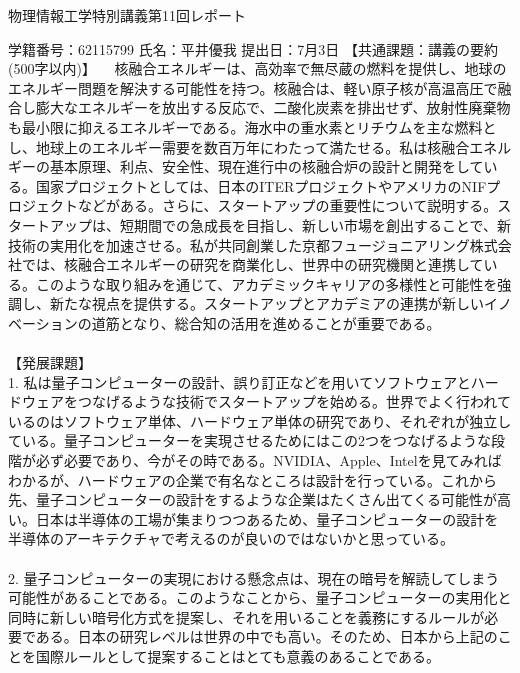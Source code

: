 \documentclass[a4paper,10.5pt]{ltjsarticle}
\begin{document}
\centerline
{\huge 物理情報工学特別講義第11回レポート}
\rightline
{学籍番号：62115799}
\rightline
{氏名：平井優我}
\rightline
{提出日：7月3日}
\rightline
{}
\leftline
{\large 【共通課題：講義の要約(500字以内)】}
　核融合エネルギーは、高効率で無尽蔵の燃料を提供し、地球のエネルギー問題を解決する可能性を持つ。核融合は、軽い原子核が高温高圧で融合し膨大なエネルギーを放出する反応で、二酸化炭素を排出せず、放射性廃棄物も最小限に抑えるエネルギーである。海水中の重水素とリチウムを主な燃料とし、地球上のエネルギー需要を数百万年にわたって満たせる。私は核融合エネルギーの基本原理、利点、安全性、現在進行中の核融合炉の設計と開発をしている。国家プロジェクトとしては、日本のITERプロジェクトやアメリカのNIFプロジェクトなどがある。さらに、スタートアップの重要性について説明する。スタートアップは、短期間での急成長を目指し、新しい市場を創出することで、新技術の実用化を加速させる。私が共同創業した京都フュージョニアリング株式会社では、核融合エネルギーの研究を商業化し、世界中の研究機関と連携している。このような取り組みを通じて、アカデミックキャリアの多様性と可能性を強調し、新たな視点を提供する。スタートアップとアカデミアの連携が新しいイノベーションの道筋となり、総合知の活用を進めることが重要である。\\
\\
\leftline
{\large 【発展課題】}\\
1. 私は量子コンピューターの設計、誤り訂正などを用いてソフトウェアとハードウェアをつなげるような技術でスタートアップを始める。世界でよく行われているのはソフトウェア単体、ハードウェア単体の研究であり、それぞれが独立している。量子コンピューターを実現させるためにはこの2つをつなげるような段階が必ず必要であり、今がその時である。NVIDIA、Apple、Intelを見てみればわかるが、ハードウェアの企業で有名なところは設計を行っている。これから先、量子コンピューターの設計をするような企業はたくさん出てくる可能性が高い。日本は半導体の工場が集まりつつあるため、量子コンピューターの設計を半導体のアーキテクチャで考えるのが良いのではないかと思っている。\\
\\
2. 量子コンピューターの実現における懸念点は、現在の暗号を解読してしまう可能性があることである。このようなことから、量子コンピューターの実用化と同時に新しい暗号化方式を提案し、それを用いることを義務にするルールが必要である。日本の研究レベルは世界の中でも高い。そのため、日本から上記のことを国際ルールとして提案することはとても意義のあることである。
\end{document}
